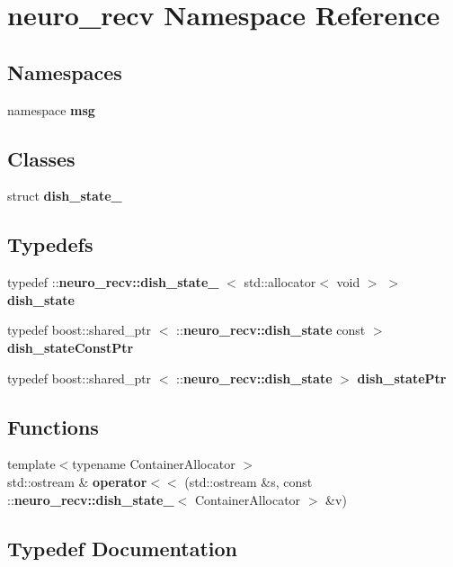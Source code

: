 \section{neuro\-\_\-recv \-Namespace \-Reference}
\label{namespaceneuro__recv}
\subsection*{\-Namespaces}
\begin{DoxyCompactItemize}
\item 
namespace {\bf msg}
\end{DoxyCompactItemize}
\subsection*{\-Classes}
\begin{DoxyCompactItemize}
\item 
struct {\bf dish\-\_\-state\-\_\-}
\end{DoxyCompactItemize}
\subsection*{\-Typedefs}
\begin{DoxyCompactItemize}
\item 
typedef \*
\-::{\bf neuro\-\_\-recv\-::dish\-\_\-state\-\_\-}\*
$<$ std\-::allocator$<$ void $>$ $>$ {\bf dish\-\_\-state}
\item 
typedef boost\-::shared\-\_\-ptr\*
$<$ \-::{\bf neuro\-\_\-recv\-::dish\-\_\-state} \*
const  $>$ {\bf dish\-\_\-state\-Const\-Ptr}
\item 
typedef boost\-::shared\-\_\-ptr\*
$<$ \-::{\bf neuro\-\_\-recv\-::dish\-\_\-state} $>$ {\bf dish\-\_\-state\-Ptr}
\end{DoxyCompactItemize}
\subsection*{\-Functions}
\begin{DoxyCompactItemize}
\item 
{\footnotesize template$<$typename Container\-Allocator $>$ }\\std\-::ostream \& {\bf operator$<$$<$} (std\-::ostream \&s, const \-::{\bf neuro\-\_\-recv\-::dish\-\_\-state\-\_\-}$<$ \-Container\-Allocator $>$ \&v)
\end{DoxyCompactItemize}


\subsection{\-Typedef \-Documentation}
